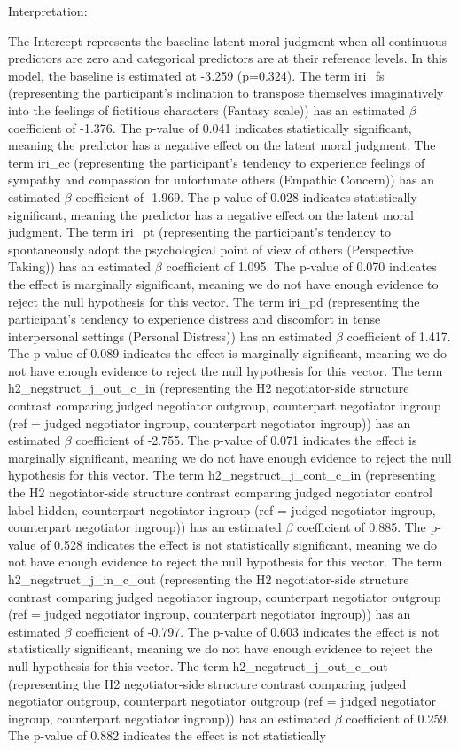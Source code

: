 \documentclass[11pt]{article}
\begin{document}
Interpretation:

The Intercept represents the baseline latent moral judgment when all continuous predictors are zero and categorical predictors are at their reference levels. In this model, the baseline is estimated at -3.259 (p=0.324). The term iri\_fs (representing the participant's inclination to transpose themselves imaginatively into the feelings of fictitious characters (Fantasy scale)) has an estimated $\beta$ coefficient of -1.376. The p-value of 0.041 indicates statistically significant, meaning the predictor has a negative effect on the latent moral judgment. The term iri\_ec (representing the participant's tendency to experience feelings of sympathy and compassion for unfortunate others (Empathic Concern)) has an estimated $\beta$ coefficient of -1.969. The p-value of 0.028 indicates statistically significant, meaning the predictor has a negative effect on the latent moral judgment. The term iri\_pt (representing the participant's tendency to spontaneously adopt the psychological point of view of others (Perspective Taking)) has an estimated $\beta$ coefficient of 1.095. The p-value of 0.070 indicates the effect is marginally significant, meaning we do not have enough evidence to reject the null hypothesis for this vector. The term iri\_pd (representing the participant's tendency to experience distress and discomfort in tense interpersonal settings (Personal Distress)) has an estimated $\beta$ coefficient of 1.417. The p-value of 0.089 indicates the effect is marginally significant, meaning we do not have enough evidence to reject the null hypothesis for this vector. The term h2\_negstruct\_j\_out\_c\_in (representing the H2 negotiator-side structure contrast comparing judged negotiator outgroup, counterpart negotiator ingroup (ref = judged negotiator ingroup, counterpart negotiator ingroup)) has an estimated $\beta$ coefficient of -2.755. The p-value of 0.071 indicates the effect is marginally significant, meaning we do not have enough evidence to reject the null hypothesis for this vector. The term h2\_negstruct\_j\_cont\_c\_in (representing the H2 negotiator-side structure contrast comparing judged negotiator control label hidden, counterpart negotiator ingroup (ref = judged negotiator ingroup, counterpart negotiator ingroup)) has an estimated $\beta$ coefficient of 0.885. The p-value of 0.528 indicates the effect is not statistically significant, meaning we do not have enough evidence to reject the null hypothesis for this vector. The term h2\_negstruct\_j\_in\_c\_out (representing the H2 negotiator-side structure contrast comparing judged negotiator ingroup, counterpart negotiator outgroup (ref = judged negotiator ingroup, counterpart negotiator ingroup)) has an estimated $\beta$ coefficient of -0.797. The p-value of 0.603 indicates the effect is not statistically significant, meaning we do not have enough evidence to reject the null hypothesis for this vector. The term h2\_negstruct\_j\_out\_c\_out (representing the H2 negotiator-side structure contrast comparing judged negotiator outgroup, counterpart negotiator outgroup (ref = judged negotiator ingroup, counterpart negotiator ingroup)) has an estimated $\beta$ coefficient of 0.259. The p-value of 0.882 indicates the effect is not statistically 
\end{document}
